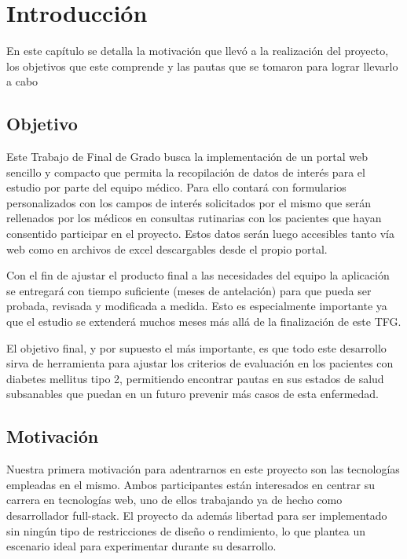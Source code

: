 \chapter{Introducción}
 En este capítulo se detalla la motivación que llevó a la realización del proyecto, los objetivos que este comprende y las pautas que se tomaron para lograr llevarlo a cabo
    
    \section{Objetivo}
    
    Este Trabajo de Final de Grado busca la implementación de un portal web sencillo y compacto que permita la recopilación de datos de interés para el estudio por parte del equipo médico. Para ello contará con formularios personalizados con los campos de interés  solicitados por el mismo que serán rellenados por los médicos en consultas rutinarias con los pacientes que hayan consentido participar en el proyecto. Estos datos serán luego accesibles tanto vía web como en archivos de excel descargables desde el propio portal.\newline

	Con el fin de ajustar el producto final a las necesidades del equipo la aplicación se entregará con tiempo suficiente (meses de antelación) para que pueda ser probada, revisada y modificada a medida. Esto es especialmente importante ya que el estudio se extenderá muchos meses más allá de la finalización de este TFG.\newline

	El objetivo final, y por supuesto el más importante, es que todo este desarrollo sirva de herramienta para ajustar los criterios de evaluación en los pacientes con diabetes mellitus tipo 2, permitiendo encontrar pautas en sus estados de salud subsanables que puedan en un futuro prevenir más casos de esta enfermedad.\newpage
	
	\section{Motivación}
    
    Nuestra primera motivación para adentrarnos en este proyecto son las tecnologías empleadas en el mismo. Ambos participantes están interesados en centrar su carrera en tecnologías web, uno de ellos trabajando ya de hecho como desarrollador full-stack. El proyecto da además libertad para ser implementado sin ningún tipo de restricciones de diseño o rendimiento, lo que plantea un escenario ideal para experimentar durante su desarrollo.\newline

